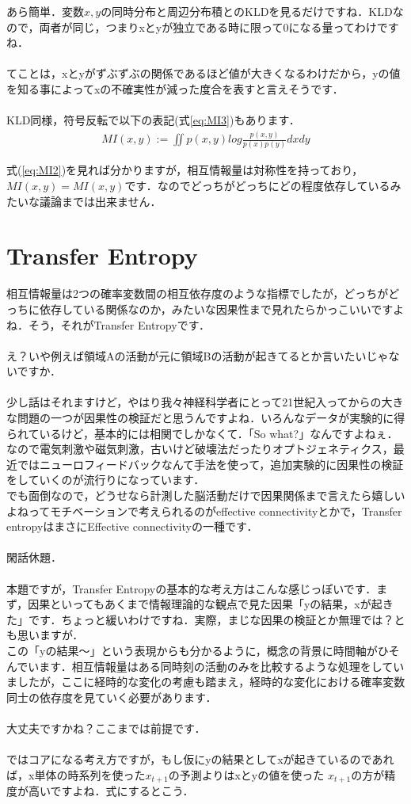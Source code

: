 \documentclass[11pt,a4paper,uplatex]{ujreport}
\begin{document}
あら簡単．$変数x,y$の同時分布と周辺分布積とのKLDを見るだけですね．KLDなので，両者が同じ，つまりxとyが独立である時に限って0になる量ってわけですね．\\
\\
てことは，xとyがずぶずぶの関係であるほど値が大きくなるわけだから，yの値を知る事によってxの不確実性が減った度合を表すと言えそうです\cite{prml}．\\
\\
KLD同様，符号反転で以下の表記(式\ref{eq:MI3})もあります．
\begin{eqnarray}
\label{eq:MI3}
  MI(x,y) := \iint p(x,y) log \frac{p(x,y)}{p(x)p(y)} dxdy
\end{eqnarray}

式(\ref{eq:MI2})を見れば分かりますが，相互情報量は対称性を持っており，$MI(x,y) = MI(x,y)$です．なのでどっちがどっちにどの程度依存しているみたいな議論までは出来ません．
\section{Transfer Entropy}
相互情報量は2つの確率変数間の相互依存度のような指標でしたが，どっちがどっちに依存している関係なのか，みたいな因果性まで見れたらかっこいいですよね．そう，それがTransfer Entropyです．\\
\\
え？いや例えば領域Aの活動が元に領域Bの活動が起きてるとか言いたいじゃないですか．\\
\\
少し話はそれますけど，やはり我々神経科学者にとって21世紀入ってからの大きな問題の一つが因果性の検証だと思うんですよね．いろんなデータが実験的に得られているけど，基本的には相関でしかなくて．「So what?」なんですよねぇ．なので電気刺激や磁気刺激，古いけど破壊法だったりオプトジェネティクス，最近ではニューロフィードバックなんて手法を使って，追加実験的に因果性の検証をしていくのが流行りになっています．\\
でも面倒なので，どうせなら計測した脳活動だけで因果関係まで言えたら嬉しいよねってモチベーションで考えられるのがeffective connectivityとかで，Transfer entropyはまさにEffective connectivityの一種です．\\
\\
閑話休題．\\
\\
本題ですが，Transfer Entropyの基本的な考え方はこんな感じっぽいです．まず，因果といってもあくまで情報理論的な観点で見た因果「yの結果，xが起きた」です．ちょっと緩いわけですね．実際，まじな因果の検証とか無理では？とも思いますが．\\
この「yの結果～」という表現からも分かるように，概念の背景に時間軸がひそんでいます．相互情報量はある同時刻の活動のみを比較するような処理をしていましたが，ここに経時的な変化の考慮も踏まえ，経時的な変化における確率変数同士の依存度を見ていく必要があります．\\
\\
大丈夫ですかね？ここまでは前提です．\\
\\
ではコアになる考え方ですが，もし仮にyの結果としてxが起きているのであれば，x単体の時系列を使った$x_{t+1}$の予測よりはxとyの値を使った $x_{t+1}$の方が精度が高いですよね．式にするとこう．
\end{document}
